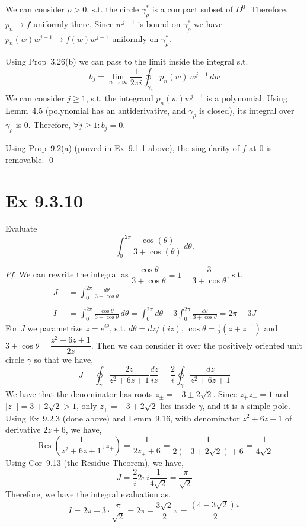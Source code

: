\documentclass[a4paper]{article}
\DeclareMathOperator{\Res}{Res}
\begin{document}
\medskip
We can consider $\rho>0$, s.t. the circle $\gamma_\rho^{*}$ is a compact subset of $D^0$. Therefore, $p_n\to f$ uniformly there. Since $w^{j-1}$ is bound on $\gamma_\rho^{*}$
we have $p_n(w)w^{j-1}\to f(w)w^{j-1}$ uniformly on $\gamma_\rho^{*}$. 

\medskip
Using Prop~3.26(b) we can pass to the limit inside the integral s.t.
\[
b_j=\lim_{n\to\infty}\frac{1}{2\pi i}\oint_{\gamma_\rho}p_n(w)\,w^{j-1}\,dw
\]
We can consider $j\ge 1$, s.t. the integrand $p_n(w)w^{j-1}$ is a polynomial. Using Lemm~4.5 (polynomial has an antiderivative, and $\gamma_\rho$ is closed), its integral over $\gamma_\rho$ is $0$. Therefore, $\forall j \ge 1: b_j=0$. 

\medskip
Using Prop~9.2(a) (proved in Ex~9.1.1 above), the singularity of $f$ at $0$ is removable. \qed

\newpage
\section*{Ex 9.3.10}

\begin{prob}
Evaluate
\[
\int_{0}^{2\pi}\frac{\cos(\theta)}{3+\cos(\theta)}\,d\theta.
\]
\end{prob}

\textit{Pf.} We can rewrite the integral as $\dfrac{\cos\theta}{3+\cos\theta}=1-\dfrac{3}{3+\cos\theta}$, s.t.
\begin{align*}
J: &=\int_{0}^{2\pi}\frac{d\theta}{3+\cos\theta} \\
\\
I &=\int_{0}^{2\pi}\frac{\cos\theta}{3+\cos\theta}\,d\theta
=\int_{0}^{2\pi}d\theta-3\int_{0}^{2\pi}\frac{d\theta}{3+\cos\theta}
=2\pi-3J
\end{align*}
For $J$ we parametrize $z=e^{i\theta}$, s.t. $d\theta=dz/(iz)$, $\cos\theta=\tfrac12(z+z^{-1})$
and $3+\cos\theta=\dfrac{z^2+6z+1}{2z}$. Then we can consider it over the positively oriented unit circle $\gamma$ so that we have,
\[
J=\oint_{\gamma}\frac{2z}{z^2+6z+1}\frac{dz}{iz}
=\frac{2}{i}\oint_{\gamma}\frac{dz}{z^2+6z+1}
\]
We have that the denominator has roots $z_{\pm}=-3\pm 2\sqrt2$. Since $z_+z_-=1$ and
$|z_-|=3+2\sqrt2>1$, only $z_+=-3+2\sqrt2$ lies inside $\gamma$, and it is a
simple pole. Using Ex~9.2.3 (done above) and Lemm~9.16, with denominator $z^2+6z+1$ of derivative $2z+6$, we have,
\[
\Res\!\left(\frac{1}{z^2+6z+1};z_+\right)=\frac{1}{2z_++6}
=\frac{1}{2(-3+2\sqrt2)+6}=\frac{1}{4\sqrt2}
\]
Using Cor~9.13 (the Residue Theorem), we have,
\[
J=\frac{2}{i} 2\pi i\frac{1}{4\sqrt2}=\frac{\pi}{\sqrt2}
\]
Therefore, we have the integral evaluation as,
\[
I=2\pi-3\cdot\frac{\pi}{\sqrt2}=2\pi-\frac{3\sqrt2}{2}\pi
=\frac{(4-3\sqrt2)\pi}{2}
\]
\end{document}
